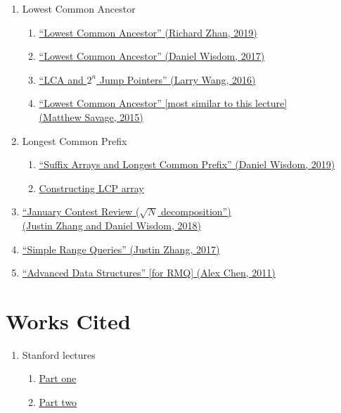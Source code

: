 \documentclass[11pt, oneside]{article}
\begin{document}
\begin{enumerate}
  \item Lowest Common Ancestor
    \begin{enumerate}
       \item \href{https://activities.tjhsst.edu/sct/lectures/1920/2019_10_25_LCA.pdf}{``Lowest Common Ancestor'' (Richard Zhan, 2019)}
       \item \href{https://activities.tjhsst.edu/sct/lectures/1718/2017-12-01_Lowest_Common_Ancestor.pdf}{``Lowest Common Ancestor'' (Daniel Wisdom, 2017)}
       \item \href{https://activities.tjhsst.edu/sct/lectures/1617/2016-10-21_LCA_and_2_n_Jump_Pointers.pdf}{``LCA and \( 2^n \) Jump Pointers'' (Larry Wang, 2016)}
       \item \href{https://activities.tjhsst.edu/sct/lectures/1415/SCT_Lowest_Common_Ancestor.pdf}{``Lowest Common Ancestor'' [most similar to this lecture] \\ (Matthew Savage, 2015)}
    \end{enumerate}
  \item Longest Common Prefix
    \begin{enumerate}
      \item \href{https://activities.tjhsst.edu/sct/lectures/1819/2019_03_29_Suffix_Arrays_and_LCP.pdf}{``Suffix Arrays and Longest Common Prefix'' (Daniel Wisdom, 2019)}
      \item \href{http://web.stanford.edu/class/cs166/lectures/03/Slides03.pdf}{Constructing LCP array}
    \end{enumerate}
  \item \href{https://activities.tjhsst.edu/sct/lectures/1718/2018-02-09_USACO_Gold_Plat_January_Contest_Review_(square-root_decomposition).pdf}
  {``January Contest Review (\( \sqrt{N} \) decomposition'') \\ (Justin Zhang and Daniel Wisdom, 2018)}
  \item \href{https://activities.tjhsst.edu/sct/lectures/1718/2017-10-06_Simple_Range_Queries.pdf}{``Simple Range Queries'' (Justin Zhang, 2017)}
  \item \href{https://activities.tjhsst.edu/sct/lectures/1112/rquery102811.pdf}{``Advanced Data Structures'' [for RMQ] (Alex Chen, 2011)}
\end{enumerate}

\section{Works Cited}

\begin{enumerate}
  \item Stanford lectures
    \begin{enumerate}
      \item \href{http://web.stanford.edu/class/cs166/lectures/00/Slides00.pdf}{Part one}
      \item \href{http://web.stanford.edu/class/cs166/lectures/01/Slides01.pdf}{Part two}
    \end{enumerate}
\end{enumerate}
\end{document}

